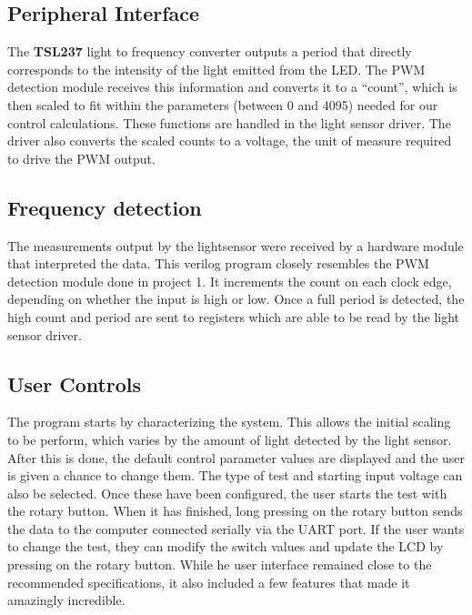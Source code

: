 \documentclass[11pt]{article}
\begin{document}
\subsection{Peripheral Interface}
The \textbf{TSL237} light to frequency converter outputs a period that directly corresponds to the intensity of the light emitted from the LED.  The PWM detection module receives this information and converts it to a ``count'', which is then scaled to fit within the parameters (between 0 and 4095) needed for our control calculations.  These functions are handled in the light sensor driver.  The driver also converts the scaled counts to a voltage, the unit of measure required to drive the PWM output.

%  

\subsection{Frequency detection}
The measurements output by the lightsensor were received by a hardware module that interpreted the data.  This verilog program closely resembles the PWM detection module done in project 1.  It increments the count on each clock edge, depending on whether the input is high or low.  Once a full period is detected, the high count and period are sent to registers which are able to be read by the light sensor driver.  

\subsection{User Controls} 
The program starts by characterizing the system.  This allows the initial scaling to be perform, which varies by the amount of light detected by the light sensor. After this is done, the default control parameter values are displayed and the user is given a chance to change them.  The type of test and starting input voltage can also be selected.  Once these have been configured, the user starts the test with the rotary button.  When it has finished, long pressing on the rotary button sends the data to the computer connected serially via the UART port.  If the user wants to change the test, they can modify the switch values and update the LCD by pressing on the rotary button.  While he user interface remained close to the recommended specifications, it also included a few features that made it amazingly incredible.
 
\end{document}
